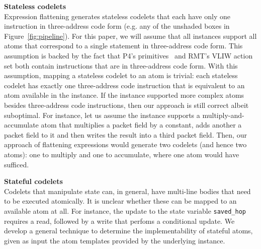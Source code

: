 \textbf{Stateless codelets}\\
Expression flattening generates stateless codelets that each have only one
instruction in three-address code form (e.g. any of the unshaded boxes in
Figure~\ref{fig:pipeline}). For this paper, we will assume that all \absmachine
instances support all atoms that correspond to a single statement in
three-address code form. This assumption is backed by the fact that P4's
primitives~\cite{p4spec} and RMT's VLIW action set both contain instructions
that are in three-address code form. With this assumption, mapping a stateless
codelet to an atom is trivial: each stateless codelet has exactly one
three-address code instruction that is equivalent to an atom available in the
\absmachine instance.
If the \absmachine instance supported more complex atoms besides three-address
code instructions, then our approach is still correct albeit suboptimal. For
instance, let us assume the \absmachine instance supports a
multiply-and-accumulate atom that multiplies a packet field by a constant, adds
another a packet field to it and then writes the result into a third packet
field. Then, our approach of flattening expressions would generate two codelets
(and hence two atoms): one to multiply and one to accumulate, where one atom
would have sufficed.

\textbf{Stateful codelets}\\
Codelets that manipulate state can, in general, have multi-line bodies that
need to be executed atomically. It is unclear whether these can be mapped to an
available atom at all. For instance, the update to the state variable
\texttt{saved\_hop} requires a read, followed by a write that perfoms a
conditional update. We develop a general technique to determine the
implementability of stateful atoms, given as input the atom templates provided
by the underlying \absmachine instance.

